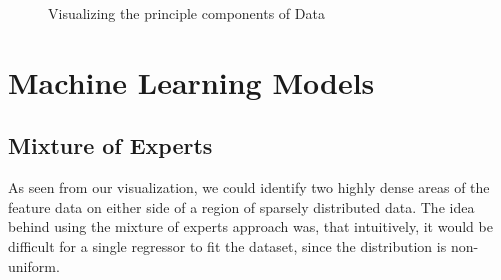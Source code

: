 \documentclass[a4paper]{article}
\begin{document}
\begin{figure}
\centering
{}
\caption[]{Visualizing the principle components of Data}
\label{fig:nn-runs}
\end{figure}
 
\section{Machine Learning Models}
\label{sec:models}
\subsection{Mixture of Experts}
As seen from our visualization, we could identify two highly dense areas of the feature data on either side of a region of sparsely distributed data. The idea behind using the mixture of experts approach was, that intuitively, it would be difficult for a single regressor to fit the dataset, since the distribution is non-uniform.
\end{document}
